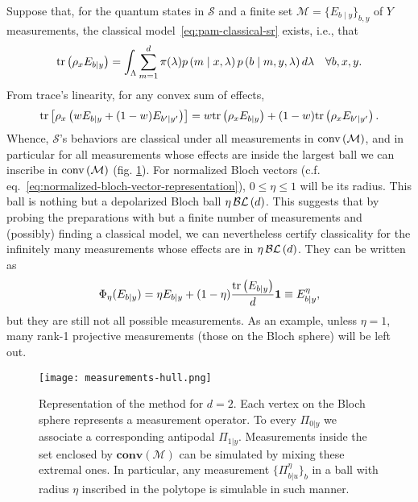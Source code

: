         Suppose that, for the quantum states in $\mathcal{S}$ and a finite set $\mathcal{M} = \{ E_{b \mid y} \}_{b,y}$ of $Y$ measurements, the classical model~\eqref{eq:pam-classical-sr} exists, i.e., that
        \begin{equation}
            \text{tr}\left( \rho_x E_{b\mid y} \right) = \int_{\Lambda} \sum_{m = 1}^{d} \pi(\lambda) p \left( m \mid x,\lambda \right) p \left( b \mid m,y,\lambda \right) d\lambda \quad\forall b,x,y .
        \label{eq:quantum-classicality-model}
        \end{equation}
        From trace's linearity, for any convex sum of effects,
        \begin{equation*}
            \text{tr}\left[ \rho_x \left( w E_{b\mid y} + (1-w) E_{b^\prime \mid y^\prime} \right) \right] = w\text{tr}\left( \rho_x E_{b\mid y} \right) + (1-w) \text{tr}\left( \rho_x E_{b^\prime \mid y^\prime} \right) .
        \end{equation*}
        Whence, $\mathcal{S}$'s behaviors are classical under all measurements in $\text{conv} \left( \mathcal{M} \right)$, and in particular for all measurements whose effects are inside the largest ball we can inscribe in $\text{conv} \left( \mathcal{M} \right)$ (fig. \ref{fig:measurements-hull}). For normalized Bloch vectors (c.f. eq.~\eqref{eq:normalized-bloch-vector-representation}), $0 \leq \eta \leq 1$ will be its radius. This ball is nothing but a depolarized Bloch ball $\eta \, \mathcal{BL}\left( d \right)$. This suggests that by probing the preparations with but a finite number of measurements and (possibly) finding a classical model, we can nevertheless certify classicality for the infinitely many measurements whose effects are in $\eta \, \mathcal{BL}\left( d \right)$. They can be written as
        \begin{equation}
            \Phi_\eta(E_{b \mid y}) = \eta E_{b \mid y} + (1 - \eta) \frac{ \text{tr}\left( E_{b \mid y} \right) }{d} \mathbf{1} \equiv E_{b \mid y}^\eta,
            \label{depolarized-measurements}
        \end{equation}
        but they are still not all possible measurements. As an example, unless $\eta = 1$, many rank-1 projective measurements (those on the Bloch sphere) will be left out.

		\begin{figure}
			\begin{minipage}[c]{0.42\textwidth}
				\centering
            	\texttt{[image: measurements-hull.png]}
			\end{minipage}
			\begin{minipage}[c]{0.56\textwidth}
            	\caption{Representation of the method for $d = 2$. Each vertex on the Bloch sphere represents a measurement operator. To every $\Pi_{0 \vert y}$ we associate a corresponding antipodal $\Pi_{1 \vert y}$. Measurements inside the set enclosed by $\textbf{conv}(\mathcal{M})$ can be simulated by mixing these extremal ones. In particular, any measurement $\{ \Pi_{b \vert u}^\eta \}_b$ in a ball with radius $\eta$ inscribed in the polytope is simulable in such manner.}
   		    	\label{fig:measurements-hull}
			\end{minipage}
		\end{figure}

